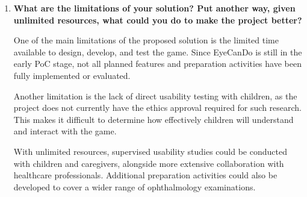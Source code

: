 \documentclass[10pt, titlepage]{article}
\newcommand{\mgurl}{https://github.com/team-hindsight/ophthamology-game/blob/main/pdfs/Design/SoftArchitecture/MG.pdf}
\newcommand{\mg}{\href{\mgurl}{MG}}
\begin{document}
\begin{enumerate}
    While developing the Design Document, the SRS and Hazard
    Analysis were also revised based on feedback from the
    supervisor and TAs. These changes helped clarify existing
    requirements and ensure that the proposed design addressed
    the project's functional, safety, and usability expectations.

    In the SRS, several requirements were refined regarding
    gameplay interactions, saving and restoring progress, and
    the accuracy of educational content. Requirement traceability
    was also updated, and project goals were clarified to better
    reflect what could realistically be evaluated during the
    capstone.

    In the Hazard Analysis, several safety requirements were
    improved, including those related to device performance,
    inclusive character customization, audio interruptions,
    and the presentation of medical information. Mitigation
    strategies were also clarified to better align with the
    project's scope.

    Since some requirements and identifiers changed, the
    corresponding references in other documents, including
    the VnV Plan, were updated to maintain consistency
    and traceability.

    Overall, these revisions provided a clearer understanding
    of the system and a stronger foundation for defining
    module responsibilities and interfaces in the MIS and \mg{}.

    \item \textbf{What are the limitations of your solution? Put another way,
    given unlimited resources, what could you do to make the project better?}

    
    One of the main limitations of the proposed solution is the
    limited time available to design, develop, and test the game.
    Since EyeCanDo is still in the early PoC stage, not all
    planned features and preparation activities have been
    fully implemented or evaluated.

    Another limitation is the lack of direct usability testing
    with children, as the project does not currently have the
    ethics approval required for such research. This makes it
    difficult to determine how effectively children will
    understand and interact with the game.

    With unlimited resources, supervised usability studies
    could be conducted with children and caregivers, alongside
    more extensive collaboration with healthcare professionals.
    Additional preparation activities could also be developed
    to cover a wider range of ophthalmology examinations.


\end{enumerate}
\end{document}
